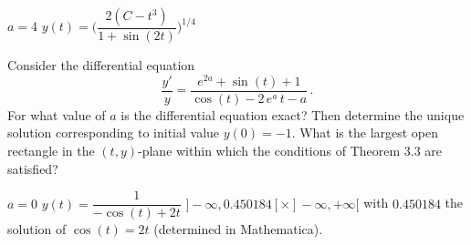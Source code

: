 \begin{Answer}
    \begin{multicols}{2}
        \Question $a = 4$
        \Question $y(t) = \Bigg(\dfrac{2\left(C - t^3\right)}{1 + \sin(2t)}\Bigg)^{1/4}$
    \EndCurrentQuestion
    \end{multicols}
\end{Answer}

\begin{Exercise} Consider the differential equation
\begin{equation*}\label{eqk1}
\frac{y'}{y}=\frac{e^{2a}+\sin(t)+1}{\cos(t) -2\,e^a\,t-a}\,.
\end{equation*}
\Question For what value of $a$ is the differential equation exact? 
\Question Then determine the unique solution corresponding to initial value $y(0)=-1$.
\Question What is the largest open rectangle in the $(t,y)$-plane within which the conditions of Theorem 3.3 are satisfied?
\end{Exercise}

\begin{Answer}
        \Question $a = 0$
        \Question $y(t) = \dfrac{1}{-\cos (t) + 2t}$
        \Question $]-\infty, 0.450184[ \times ]-\infty,+\infty[$ with $0.450184$ the solution of $\cos(t)=2t$ (determined in Mathematica).
    \EndCurrentQuestion
\end{Answer}

